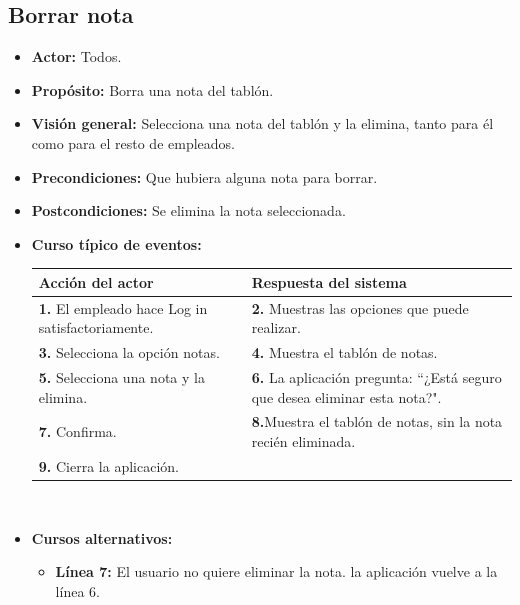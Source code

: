 \documentclass[spanish,a4paper,11pt, twoside]{report}	%
\begin{document}
		\subsection{Borrar nota}
			\begin{itemize}
			\item \textbf{Actor:} Todos.
			\item \textbf{Propósito:} Borra una nota del tablón.
			\item \textbf{Visión general:} Selecciona una nota del tablón y la elimina, tanto para él como para el resto de empleados.
			\item \textbf{Precondiciones:} Que hubiera alguna nota para borrar.
			\item \textbf{Postcondiciones:} Se elimina la nota seleccionada.
			\item \textbf{Curso típico de eventos:} 	\\
				\begin{tabular}{|p{6cm}||p{6cm}|}
				\hline
				\textbf{Acción del actor} & \textbf{Respuesta del sistema} \\ \hline \hline
				\textbf{1.}    El empleado hace Log in satisfactoriamente. & \textbf{2.} Muestras las opciones que puede realizar. \\ \hline
				\textbf{3.} Selecciona la opción notas. & \textbf{4.} Muestra el tablón de notas. \\ \hline
				\textbf{5.} Selecciona una nota y la elimina.	& \textbf{6.} La aplicación pregunta: “¿Está seguro que desea eliminar esta nota?". \\ \hline
				\textbf{7.} Confirma.	& \textbf{8.}Muestra el tablón de notas, sin la nota recién eliminada. \\ \hline
				\textbf{9.} Cierra la aplicación. &  \\ \hline
			\end{tabular}
			\\
			\item \textbf{Cursos alternativos:} 
			\begin{itemize}
			\item  \textbf{Línea 7:} El usuario no quiere eliminar la nota. la aplicación vuelve a la línea 6.
			\end {itemize}
		\end {itemize}

\newpage
\end{document}
